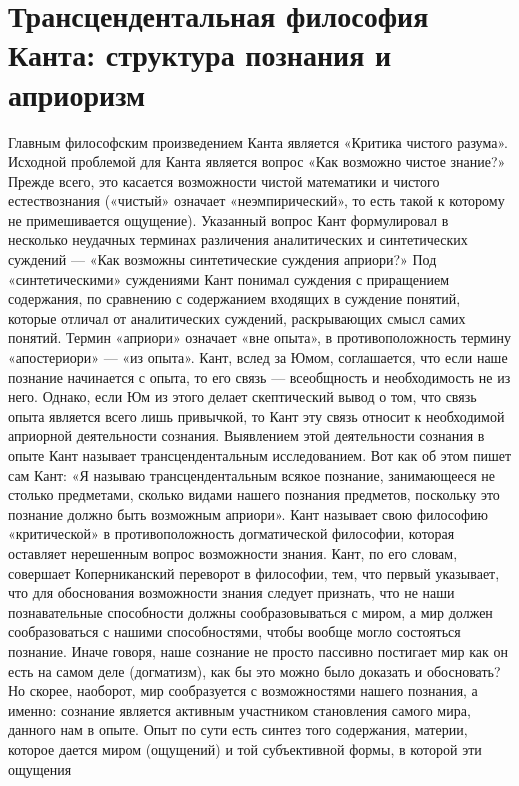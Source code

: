 \documentclass[12pt]{article}
\begin{document}
\section{Трансцендентальная философия Канта: структура познания и априоризм}
Главным философским произведением Канта является «Критика чистого разума». Исходной проблемой для
Канта  является  вопрос  «Как  возможно  чистое  знание?»  Прежде  всего,  это  касается  возможности  чистой
математики и чистого естествознания («чистый» означает «неэмпирический», то есть такой к которому не
примешивается  ощущение).  Указанный  вопрос  Кант  формулировал  в  несколько  неудачных  терминах
различения аналитических и синтетических суждений — «Как возможны синтетические суждения априори?»
Под  «синтетическими»  суждениями  Кант  понимал  суждения  с  приращением  содержания,  по  сравнению  с
содержанием  входящих в  суждение понятий, которые  отличал от  аналитических суждений, раскрывающих
смысл самих понятий. Термин «априори» означает «вне опыта», в противоположность термину «апостериори»
— «из опыта». Кант, вслед за Юмом, соглашается, что если наше познание начинается с опыта, то его связь —
всеобщность и необходимость не из него. Однако, если Юм из этого делает скептический вывод о том, что связь
опыта является всего лишь привычкой, то Кант эту связь относит к необходимой априорной деятельности
сознания. Выявлением этой деятельности сознания в опыте Кант называет трансцендентальным исследованием.
Вот как об этом пишет сам Кант: «Я называю трансцендентальным всякое познание, занимающееся не столько
предметами, сколько видами нашего познания предметов, поскольку это познание должно быть возможным
априори». Кант называет свою философию «критической» в противоположность догматической философии,
которая оставляет нерешенным вопрос возможности знания. Кант, по его словам, совершает Коперниканский
переворот в философии, тем, что первый указывает, что для обоснования возможности знания следует признать,
что не наши познавательные способности должны сообразовываться с миром, а мир должен сообразоваться с
нашими способностями, чтобы вообще могло состояться познание. Иначе говоря, наше сознание не просто
пассивно постигает мир как он есть на самом деле (догматизм), как бы это можно было доказать и обосновать?
Но  скорее,  наоборот,  мир  сообразуется  с  возможностями  нашего  познания,  а  именно:  сознание  является
активным  участником  становления  самого  мира,  данного  нам  в  опыте.  Опыт  по  сути  есть  синтез  того
содержания, материи, которое дается миром (ощущений) и той субъективной формы, в которой эти ощущения
\end{document}
